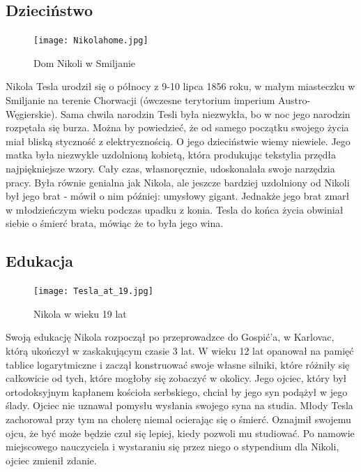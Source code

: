 \documentclass{article}
\begin{document}
\begin{large}


\subsection{Dzieciństwo}
\begin{figure}
\vspace{0pt}
\texttt{[image: Nikolahome.jpg]}
\vspace{-10pt}
\caption{Dom Nikoli w Smiljanie}
\vspace{-10pt}
\end{figure}


Nikola Tesla urodził się o północy z 9-10 lipca 1856 roku, w małym miasteczku w Smiljanie na terenie Chorwacji (ówczesne  terytorium imperium Austro-Węgierskie). Sama chwila narodzin Tesli była niezwykła, bo w noc jego narodzin rozpętała się burza. Można by powiedzieć, że od samego początku swojego życia miał bliską styczność z elektrycznością. O jego dzieciństwie wiemy niewiele. Jego matka była niezwykle uzdolnioną kobietą, która produkując tekstylia przędła najpiękniejsze wzory. Cały czas, własnoręcznie, udoskonalała swoje narzędzia pracy. Była równie genialna jak Nikola, ale jeszcze bardziej uzdolniony od Nikoli był jego brat - mówił o nim później: umysłowy gigant. Jednakże jego brat zmarł w młodzieńczym wieku podczas upadku z konia. Tesla do końca życia obwiniał siebie o śmierć brata, mówiąc że to była jego wina.
\cite{art:1}
\\


\subsection{Edukacja}

\begin{figure}
\vspace{-20pt}
\texttt{[image: Tesla\_at\_19.jpg]}
\vspace{-10pt}
\caption{Nikola w wieku 19 lat}
\vspace{-10pt}
\end{figure}

\indent Swoją edukację Nikola rozpoczął po przeprowadzce do Gospić'a, w Karlovac, którą ukończył w zaskakującym czasie 3 lat. W wieku 12 lat opanował na pamięć tablice logarytmiczne i zaczął konstruować swoje własne silniki, które różniły się całkowicie od tych, które mogłoby się zobaczyć w okolicy. Jego ojciec, który był ortodoksyjnym kapłanem kościoła serbskiego, chciał by jego syn podążył w jego ślady. Ojciec nie uznawał pomysłu wysłania swojego syna na studia. Młody Tesla zachorował przy tym na cholerę niemal ocierając się o śmierć. Oznajmił swojemu ojcu, że być może będzie czuł się lepiej, kiedy pozwoli mu studiować. Po namowie miejscowego nauczyciela i wystaraniu się przez niego o stypendium dla Nikoli, ojciec zmienił zdanie.
\\


\end{large}
\end{document}

